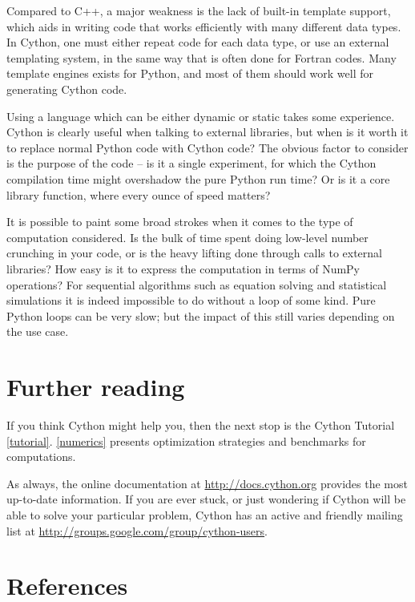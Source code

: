 \documentclass[letterpaper,11pt,english]{article}
\begin{document}
Compared to C++, a major weakness is the lack of built-in template
support, which aids in writing code that works efficiently with many
different data types. In Cython, one must either repeat code for each
data type, or use an external templating system, in the same way that
is often done for Fortran codes. Many template engines exists for
Python, and most of them should work well for generating Cython code.

Using a language which can be either dynamic or static takes some
experience.  Cython is clearly useful when talking to external
libraries, but when is it worth it to replace normal Python code with
Cython code?  The obvious factor to consider is the purpose of the
code -- is it a single experiment, for which the Cython compilation
time might overshadow the pure Python run time?  Or is it a core
library function, where every ounce of speed matters?

It is possible to paint some broad strokes when it comes to the type
of computation considered.  Is the bulk of time spent doing low-level
number crunching in your code, or is the heavy lifting done through
calls to external libraries?  How easy is it to express the
computation in terms of NumPy operations? For sequential algorithms
such as equation solving and statistical simulations it is indeed
impossible to do without a loop of some kind. Pure Python loops can be
very slow; but the impact of this still varies depending on the use
case.


\section{Further reading}

If you think Cython might help you, then the next stop is the Cython
Tutorial \hyperlink{tutorial}{{[}tutorial{]}}. \hyperlink{numerics}{{[}numerics{]}} presents optimization strategies and
benchmarks for computations.

As always, the online documentation at \href{http://docs.cython.org}{http://docs.cython.org} provides
the most up-to-date information. If you are ever stuck, or just
wondering if Cython will be able to solve your particular problem,
Cython has an active and friendly mailing list at
\href{http://groups.google.com/group/cython-users}{http://groups.google.com/group/cython-users}.

\section{References}
\end{document}
